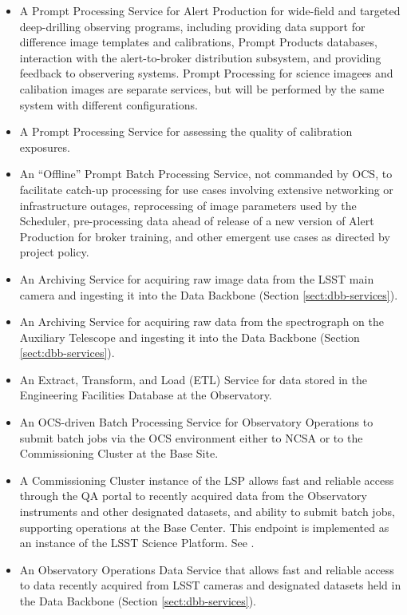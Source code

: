 \begin{itemize}
\item  A Prompt Processing Service for Alert Production for wide-field and
targeted deep-drilling observing programs, including providing data support for
difference image templates and calibrations, Prompt Products databases, interaction with
the alert-to-broker distribution subsystem, and providing feedback to observering systems. Prompt Processing for science imagees and calibation images are separate services, but will be performed by the same system with different configurations. 
\item  A Prompt Processing Service for assessing the quality of 
calibration exposures.
\item  An “Offline” Prompt Batch Processing Service, not commanded by OCS, to
facilitate catch-up processing for use cases involving extensive networking or
infrastructure outages, reprocessing of image parameters used by the Scheduler,
pre-processing data ahead of release of a new version of Alert Production for broker training, and other
emergent use cases as directed by project policy. 
\item  An Archiving Service for acquiring raw image data from the LSST main
camera and ingesting it into the Data Backbone (Section \ref{sect:dbb-services}).
\item  An Archiving Service for acquiring raw data from the spectrograph on the
Auxiliary Telescope and ingesting it into the Data Backbone (Section \ref{sect:dbb-services}).
\item  An Extract, Transform, and Load (ETL) Service for data stored in the
Engineering Facilities Database at the Observatory.
\item  An OCS-driven Batch Processing Service for Observatory Operations to
submit batch jobs via the OCS environment either to NCSA or to the Commissioning
Cluster at the Base Site.
\item  A Commissioning Cluster instance of the LSP allows fast and reliable access
through the QA portal to recently acquired data from the Observatory instruments
and other designated datasets, and ability to submit batch jobs, supporting
operations at the Base Center.  This endpoint is implemented as an instance of
the LSST Science Platform. See .
\item  An Observatory Operations Data Service that allows fast and reliable
access to data recently acquired from LSST cameras and designated datasets held
in the Data Backbone (Section \ref{sect:dbb-services}).
\end{itemize}

